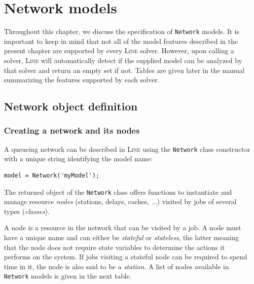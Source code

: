 \chapter{Network models}
\label{Network-models}

Throughout this chapter, we discuss the specification of \texttt{Network} models. %
It is important to keep in mind that not all of the model features described in the present chapter are supported by every
\textsc{Line} solver. However, upon calling a solver, \textsc{Line} will automatically detect if the supplied model can be
analyzed by that solver and return an empty set if not. Tables are given later in the manual summarizing the features supported by each solver.

\section{Network object definition}
\label{network-object-definition}
\subsection{Creating a network and its nodes}
A queueing network can be described in \textsc{Line} using the \texttt{Network} class constructor with a unique string identifying the model name:
\begin{lstlisting}
model = Network('myModel');
\end{lstlisting}
The returned object of the \texttt{Network} class offers functions to instantiate and manage resource \emph{nodes} (stations,  delays, caches, ...) visited by jobs of several types (\emph{classes}).

A {node} is a resource in the network that can be visited by a job. A node must have a unique name and can either be {\em stateful} or {\em stateless}, the latter meaning that the node does not require state variables to determine the actions it performs on the system. If jobs visiting a stateful node can be required to spend time in it, the node is also said to be a {\em station}. A list of nodes available in \texttt{Network} models is given in the next table.

